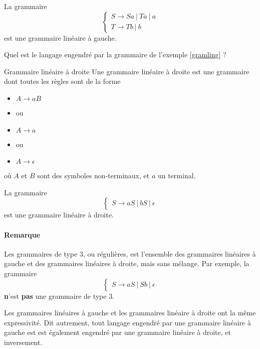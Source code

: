 \begin{example}
\label{gramling}
La grammaire 
\[
\begin{cases}
S \rightarrow Sa~|~Ta~|~a \\
T \rightarrow Tb~|~b
\end{cases}
\]
est une grammaire linéaire à gauche. 
\end{example}

\begin{exercice}
Quel est le langage engendré par la grammaire de l'exemple \ref{gramling} ?
\end{exercice}


\begin{definition}{Grammaire linéaire à droite}{}
Une grammaire linéaire à droite est une grammaire dont toutes les règles sont de la forme 
\begin{itemize}
\item[] $A \rightarrow aB$
\item[] ou
\item[] $A \rightarrow a$
\item[] ou
\item[] $A \rightarrow \epsilon$
\end{itemize}

où $A$ et $B$ sont des symboles non-terminaux, et $a$ un terminal.
\end{definition}

\begin{example}
\label{gramlind}
La grammaire 
\[
\begin{cases}
S \rightarrow aS~|~bS~|~\epsilon
\end{cases}
\]
est une grammaire linéaire à droite. 
\end{example}

\paragraph{Remarque} Les grammaires de type 3, ou régulières, est l'ensemble des grammaires linéaires à gauche et des grammaires linéaires à droite, mais sans mélange. Par exemple, la grammaire 
\[
\begin{cases}
S \rightarrow aS~|~Sb~|~\epsilon
\end{cases}
\]
\textbf{n}'est \textbf{pas} une grammaire de type 3. 

\begin{lemma}
Les grammaires linéaires à gauche et les grammaires linéaire à droite ont la même expressivité. Dit autrement, tout langage engendré par une grammaire linéaire à gauche est est également engendré par une grammaire linéaire à droite, et inversement.
\end{lemma}

